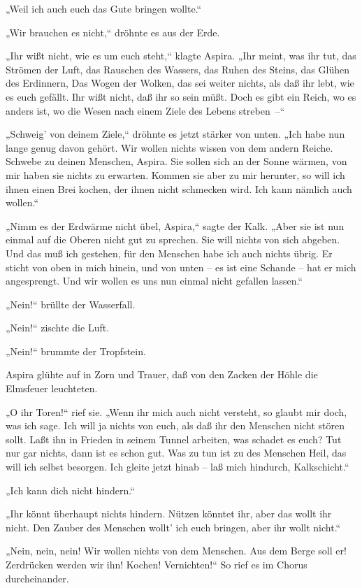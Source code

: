 „Weil ich auch euch das Gute bringen wollte.“

„Wir brauchen es nicht,“ dröhnte es aus der Erde.

„Ihr wißt nicht, wie es um euch steht,“ klagte Aspira. „Ihr meint,
was ihr tut, das Strömen der Luft, das Rauschen des Wassers, das
Ruhen des Steins, das Glühen des Erdinnern, Das Wogen der Wolken,
das sei weiter nichts, als daß ihr lebt, wie es euch gefällt. Ihr
wißt nicht, daß ihr so sein müßt. Doch es gibt ein Reich, wo es
anders ist, wo die Wesen nach einem Ziele des Lebens streben~–“

„Schweig' von deinem Ziele,“ dröhnte es jetzt stärker von unten.
„Ich habe nun lange genug davon gehört. Wir wollen nichts wissen
von dem andern Reiche. Schwebe zu deinen Menschen, Aspira. Sie
sollen sich an der Sonne wärmen, von mir haben sie nichts zu
erwarten. Kommen sie aber zu mir herunter, so will ich ihnen einen
Brei kochen, der ihnen nicht schmecken wird. Ich kann nämlich auch
wollen.“

„Nimm es der Erdwärme nicht übel, Aspira,“ sagte der Kalk. „Aber
sie ist nun einmal auf die Oberen nicht gut zu sprechen. Sie will
nichts von sich abgeben. Und das muß ich gestehen, für den Menschen
habe ich auch nichts übrig. Er sticht von oben in mich hinein, und
von unten – es ist eine Schande – hat er mich angesprengt. Und wir
wollen es uns nun einmal nicht gefallen lassen.“

„Nein!“ brüllte der Wasserfall.

„Nein!“ zischte die Luft.

„Nein!“ brummte der Tropfstein.

Aspira glühte auf in Zorn und Trauer, daß von den Zacken der Höhle
die Elmsfeuer leuchteten.

„O ihr Toren!“ rief sie. „Wenn ihr mich auch nicht versteht, so
glaubt mir doch, was ich sage. Ich will ja nichts von euch, als daß
ihr den Menschen nicht stören sollt. Laßt ihn in Frieden in seinem
Tunnel arbeiten, was schadet es euch? Tut nur gar nichts, dann ist
es schon gut. Was zu tun ist zu des Menschen Heil, das will ich
selbst besorgen. Ich gleite jetzt hinab – laß mich hindurch,
Kalkschicht.“

„Ich kann dich nicht hindern.“

„Ihr könnt überhaupt nichts hindern. Nützen könntet ihr, aber das
wollt ihr nicht. Den Zauber des Menschen wollt' ich euch bringen,
aber ihr wollt nicht.“

„Nein, nein, nein! Wir wollen nichts von dem Menschen. Aus dem
Berge soll er! Zerdrücken werden wir ihn! Kochen! Vernichten!“ So
rief es im Chorus durcheinander.

